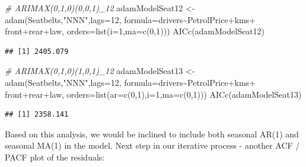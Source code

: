 \documentclass[
]{book}
\newenvironment{Shaded}{\begin{snugshade}}{\end{snugshade}}
\newcommand{\AttributeTok}[1]{\textcolor[rgb]{0.77,0.63,0.00}{#1}}
\newcommand{\CommentTok}[1]{\textcolor[rgb]{0.56,0.35,0.01}{\textit{#1}}}
\newcommand{\DecValTok}[1]{\textcolor[rgb]{0.00,0.00,0.81}{#1}}
\newcommand{\FunctionTok}[1]{\textcolor[rgb]{0.00,0.00,0.00}{#1}}
\newcommand{\NormalTok}[1]{#1}
\newcommand{\OtherTok}[1]{\textcolor[rgb]{0.56,0.35,0.01}{#1}}
\newcommand{\SpecialCharTok}[1]{\textcolor[rgb]{0.00,0.00,0.00}{#1}}
\newcommand{\StringTok}[1]{\textcolor[rgb]{0.31,0.60,0.02}{#1}}
\theoremstyle{definition}
\theoremstyle{definition}
\theoremstyle{definition}
\theoremstyle{definition}
\theoremstyle{remark}
\begin{document}
\begin{Shaded}
\begin{Highlighting}[]
\CommentTok{\# ARIMAX(0,1,0)(0,0,1)\_12}
\NormalTok{adamModelSeat12 }\OtherTok{\textless{}{-}} \FunctionTok{adam}\NormalTok{(Seatbelts,}\StringTok{"NNN"}\NormalTok{,}\AttributeTok{lags=}\DecValTok{12}\NormalTok{,}
                        \AttributeTok{formula=}\NormalTok{drivers}\SpecialCharTok{\textasciitilde{}}\NormalTok{PetrolPrice}\SpecialCharTok{+}\NormalTok{kms}\SpecialCharTok{+}
\NormalTok{                          front}\SpecialCharTok{+}\NormalTok{rear}\SpecialCharTok{+}\NormalTok{law,}
                        \AttributeTok{orders=}\FunctionTok{list}\NormalTok{(}\AttributeTok{i=}\DecValTok{1}\NormalTok{,}\AttributeTok{ma=}\FunctionTok{c}\NormalTok{(}\DecValTok{0}\NormalTok{,}\DecValTok{1}\NormalTok{)))}
\FunctionTok{AICc}\NormalTok{(adamModelSeat12)}
\end{Highlighting}
\end{Shaded}

\begin{verbatim}
## [1] 2405.079
\end{verbatim}

\begin{Shaded}
\begin{Highlighting}[]
\CommentTok{\# ARIMAX(0,1,0)(1,0,1)\_12}
\NormalTok{adamModelSeat13 }\OtherTok{\textless{}{-}} \FunctionTok{adam}\NormalTok{(Seatbelts,}\StringTok{"NNN"}\NormalTok{,}\AttributeTok{lags=}\DecValTok{12}\NormalTok{,}
                        \AttributeTok{formula=}\NormalTok{drivers}\SpecialCharTok{\textasciitilde{}}\NormalTok{PetrolPrice}\SpecialCharTok{+}\NormalTok{kms}\SpecialCharTok{+}
\NormalTok{                          front}\SpecialCharTok{+}\NormalTok{rear}\SpecialCharTok{+}\NormalTok{law,}
                        \AttributeTok{orders=}\FunctionTok{list}\NormalTok{(}\AttributeTok{ar=}\FunctionTok{c}\NormalTok{(}\DecValTok{0}\NormalTok{,}\DecValTok{1}\NormalTok{),}\AttributeTok{i=}\DecValTok{1}\NormalTok{,}\AttributeTok{ma=}\FunctionTok{c}\NormalTok{(}\DecValTok{0}\NormalTok{,}\DecValTok{1}\NormalTok{)))}
\FunctionTok{AICc}\NormalTok{(adamModelSeat13)}
\end{Highlighting}
\end{Shaded}

\begin{verbatim}
## [1] 2358.141
\end{verbatim}

Based on this analysis, we would be inclined to include both seasonal AR(1) and seasonal MA(1) in the model. Next step in our iterative process - another ACF / PACF plot of the residuals:
\end{document}
